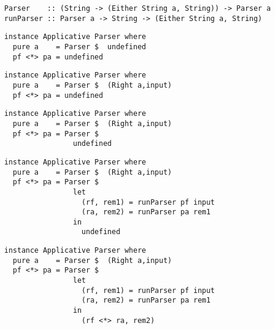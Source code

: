 \documentclass{beamer}
\begin{document}
\begin{frame}[fragile]
\begin{verbatim}
Parser    :: (String -> (Either String a, String)) -> Parser a
runParser :: Parser a -> String -> (Either String a, String)
\end{verbatim}
\begin{overprint}
\begin{verbatim}
instance Applicative Parser where
  pure a    = Parser $  undefined
  pf <*> pa = undefined
\end{verbatim}
\begin{verbatim}
instance Applicative Parser where
  pure a    = Parser $  (Right a,input)
  pf <*> pa = undefined
\end{verbatim}
\begin{verbatim}
instance Applicative Parser where
  pure a    = Parser $  (Right a,input)
  pf <*> pa = Parser $ 
                undefined
\end{verbatim}
\begin{verbatim}
instance Applicative Parser where
  pure a    = Parser $  (Right a,input)
  pf <*> pa = Parser $ 
                let
                  (rf, rem1) = runParser pf input
                  (ra, rem2) = runParser pa rem1
                in
                  undefined
\end{verbatim}
\begin{verbatim}
instance Applicative Parser where
  pure a    = Parser $  (Right a,input)
  pf <*> pa = Parser $ 
                let
                  (rf, rem1) = runParser pf input
                  (ra, rem2) = runParser pa rem1
                in
                  (rf <*> ra, rem2)
\end{verbatim}
\end{overprint}
\end{frame}
\end{document}
